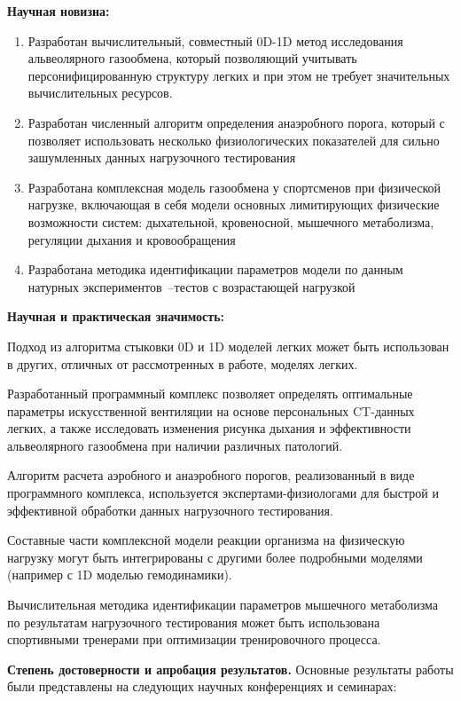 \textbf{Научная новизна:}
\begin{enumerate}
\item 
 Разработан вычислительный, совместный 0D-1D метод исследования альвеолярного газообмена, который позволяющий учитывать персонифицированную структуру легких и при этом не требует значительных вычислительных ресурсов.
 \item 
 Разработан численный алгоритм определения анаэробного порога, который с позволяет использовать несколько физиологических показателей для сильно зашумленных данных нагрузочного тестирования
 \item
 Разработана комплексная модель газообмена у спортсменов при физической нагрузке, включающая в себя модели основных лимитирующих физические возможности систем: дыхательной, кровеносной, мышечного метаболизма, регуляции дыхания и кровообращения
 \item
 Разработана методика идентификации параметров модели по данным натурных экспериментов~--тестов с возрастающей нагрузкой
  
\end{enumerate}

\textbf{Научная и практическая значимость:} 

Подход из алгоритма стыковки 0D и 1D моделей легких может быть использован в  других, отличных от рассмотренных в работе, моделях легких.

Разработанный программный комплекс позволяет определять оптимальные параметры искусственной вентиляции на основе персональных CT-данных легких, а также исследовать изменения рисунка дыхания и эффективности альвеолярного газообмена при наличии различных патологий. 

Алгоритм расчета аэробного и анаэробного порогов, реализованный в виде программного комплекса, используется экспертами-физиологами для быстрой и эффективной обработки данных нагрузочного тестирования.

Составные части комплексной модели реакции организма на физическую нагрузку могут быть интегрированы с другими более подробными моделями (например с 1D моделью гемодинамики).

Вычислительная методика идентификации параметров мышечного метаболизма по результатам нагрузочного тестирования может быть использована спортивными тренерами при оптимизации тренировочного процесса.

\textbf{Степень достоверности и апробация результатов.} 
Основные результаты работы были представлены на следующих научных конференциях и семинарах:

